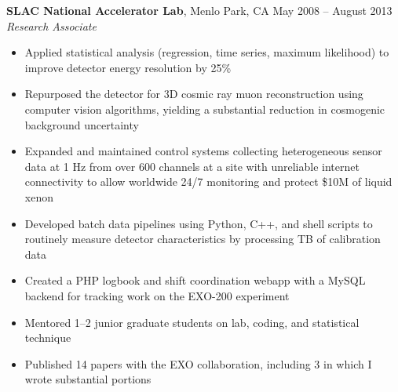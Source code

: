 \documentclass[margin,line]{resume}
\begin{document}
\begin{resume}
    \textbf{SLAC National Accelerator Lab}, Menlo Park, CA \hfill May 2008 -- August 2013\vspace{1mm}\\\vspace{1mm}%
    \textsl{Research Associate}
    \begin{itemize}
    \item Applied statistical analysis (regression, time series, maximum likelihood) to improve detector energy resolution by 25\%
    \item Repurposed the detector for 3D cosmic ray muon reconstruction using computer vision algorithms, yielding a substantial reduction in cosmogenic background uncertainty
    \item Expanded and maintained control systems collecting heterogeneous sensor data at 1 Hz from over 600 channels at a site with unreliable internet connectivity to allow worldwide 24/7 monitoring and protect \$10M of liquid xenon
    \item Developed batch data pipelines using Python, C++, and shell scripts to routinely measure detector characteristics by processing TB of calibration data
    \item Created a PHP logbook and shift coordination webapp with a MySQL backend for tracking work on the EXO-200 experiment
    \item Mentored 1--2 junior graduate students on lab, coding, and statistical technique%
    \item Published 14 papers with the EXO collaboration, including 3 in which I wrote substantial portions
    \end{itemize}





\end{resume}
\end{document}
